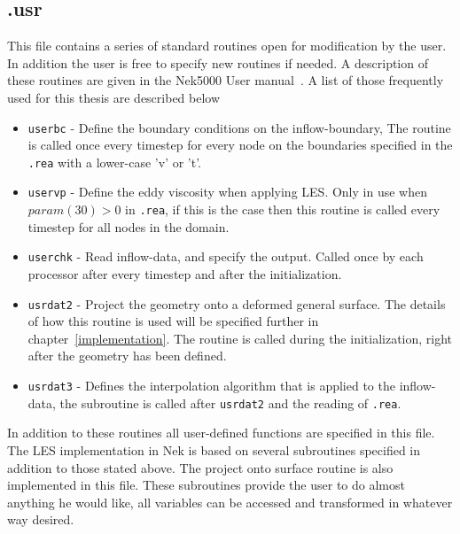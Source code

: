 \subsection{.usr}
This file contains a series of standard routines open for modification by the user. In addition the user is free to specify 
new routines if needed. A description of these routines are given in the Nek5000 User manual~\cite{Nek}. A list of those 
frequently used for this thesis are described below 
%
%
\begin{itemize}
    \item \verb|userbc| - Define the boundary conditions on the inflow-boundary, The routine is called once every timestep 
        for every node on the boundaries specified in the \verb|.rea| with a lower-case 'v' or 't'.
    \item \verb|uservp| - Define the eddy viscosity when applying LES. Only in use when $param(30)>0$ in \verb|.rea|, if this is the case 
        then this routine is called every timestep for all nodes in the domain.
    \item \verb|userchk| - Read inflow-data, and specify the output. Called once by each
        processor after every timestep and after the initialization.
    \item \verb|usrdat2| - Project the geometry onto a deformed general surface. The details of how this routine is used will be 
    specified further in chapter~\ref{implementation}. The routine is called during the initialization, right after the geometry 
    has been defined.
    \item \verb|usrdat3| - Defines the interpolation algorithm that is applied to the inflow-data, the subroutine is called 
        after \verb|usrdat2| and the reading of \verb|.rea|.
\end{itemize}
%
In addition to these routines all user-defined functions are specified in this file. The LES implementation in Nek is based
on several subroutines specified in addition to those stated above. The project onto surface routine is also implemented 
in this file. These subroutines provide the user to do almost anything he would like, all variables
can be accessed and transformed in whatever way desired. 

